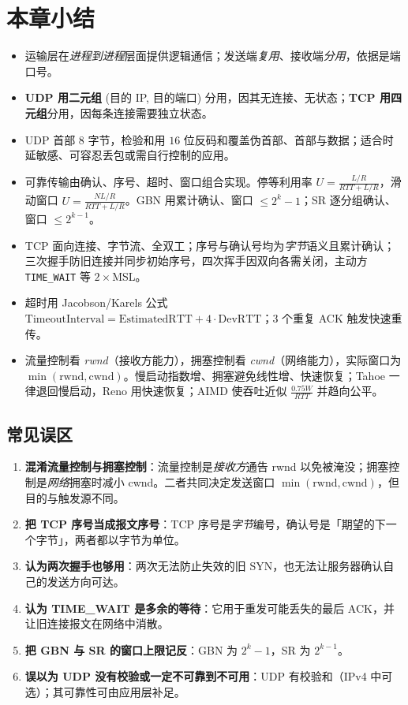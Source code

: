 \section{本章小结}

\begin{itemize}
    \item 运输层在\emph{进程到进程}层面提供逻辑通信；发送端\emph{复用}、接收端\emph{分用}，依据是端口号。
    \item \textbf{UDP 用二元组} (目的 IP, 目的端口) 分用，因其无连接、无状态；\textbf{TCP 用四元组}分用，因每条连接需要独立状态。
    \item UDP 首部 $8$ 字节，检验和用 $16$ 位反码和覆盖伪首部、首部与数据；适合时延敏感、可容忍丢包或需自行控制的应用。
    \item 可靠传输由确认、序号、超时、窗口组合实现。停等利用率 $U=\frac{L/R}{RTT+L/R}$，滑动窗口 $U=\frac{N L/R}{RTT+L/R}$。GBN 用累计确认、窗口 $\le 2^{k}-1$；SR 逐分组确认、窗口 $\le 2^{k-1}$。
    \item TCP 面向连接、字节流、全双工；序号与确认号均为\emph{字节}语义且累计确认；三次握手防旧连接并同步初始序号，四次挥手因双向各需关闭，主动方 \texttt{TIME\_WAIT} 等 $2\times$MSL。
    \item 超时用 Jacobson/Karels 公式 $\text{TimeoutInterval}=\text{EstimatedRTT}+4\cdot\text{DevRTT}$；$3$ 个重复 ACK 触发快速重传。
    \item 流量控制看 \emph{rwnd}（接收方能力），拥塞控制看 \emph{cwnd}（网络能力），实际窗口为 $\min(\text{rwnd},\text{cwnd})$。慢启动指数增、拥塞避免线性增、快速恢复；Tahoe 一律退回慢启动，Reno 用快速恢复；AIMD 使吞吐近似 $\frac{0.75W}{RTT}$ 并趋向公平。
\end{itemize}

\subsection*{常见误区}

\begin{enumerate}
    \item \textbf{混淆流量控制与拥塞控制}：流量控制是\emph{接收方}通告 rwnd 以免被淹没；拥塞控制是\emph{网络}拥塞时减小 cwnd。二者共同决定发送窗口 $\min(\text{rwnd},\text{cwnd})$，但目的与触发源不同。
    \item \textbf{把 TCP 序号当成报文序号}：TCP 序号是\emph{字节}编号，确认号是「期望的下一个字节」，两者都以字节为单位。
    \item \textbf{认为两次握手也够用}：两次无法防止失效的旧 SYN，也无法让服务器确认自己的发送方向可达。
    \item \textbf{认为 TIME\_WAIT 是多余的等待}：它用于重发可能丢失的最后 ACK，并让旧连接报文在网络中消散。
    \item \textbf{把 GBN 与 SR 的窗口上限记反}：GBN 为 $2^{k}-1$，SR 为 $2^{k-1}$。
    \item \textbf{误以为 UDP 没有校验或一定不可靠到不可用}：UDP 有校验和（IPv4 中可选）；其可靠性可由应用层补足。
\end{enumerate}

